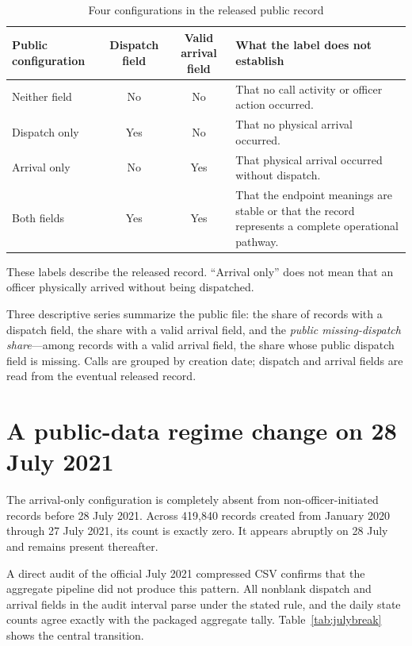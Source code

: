 \documentclass[11pt]{article}
\begin{document}
\begin{table}[!htbp]
\centering
\caption{Four configurations in the released public record}
\label{tab:states}
\begin{tabularx}{\textwidth}{@{}lccX@{}}
\toprule
Public configuration & Dispatch field & Valid arrival field & What the label does not establish \\
\midrule
Neither field & No & No & That no call activity or officer action occurred. \\
Dispatch only & Yes & No & That no physical arrival occurred. \\
Arrival only & No & Yes & That physical arrival occurred without dispatch. \\
Both fields & Yes & Yes & That the endpoint meanings are stable or that the record represents a complete operational pathway. \\
\bottomrule
\end{tabularx}
\begin{minipage}{0.96\textwidth}\footnotesize
These labels describe the released record. ``Arrival only'' does not mean that an officer physically arrived without being dispatched.
\end{minipage}
\end{table}

Three descriptive series summarize the public file: the share of records with a dispatch field, the share with a valid arrival field, and the \emph{public missing-dispatch share}---among records with a valid arrival field, the share whose public dispatch field is missing. Calls are grouped by creation date; dispatch and arrival fields are read from the eventual released record.

\section{A public-data regime change on 28 July 2021}

The arrival-only configuration is completely absent from non-officer-initiated records before 28 July 2021. Across 419,840 records created from January 2020 through 27 July 2021, its count is exactly zero. It appears abruptly on 28 July and remains present thereafter.

A direct audit of the official July 2021 compressed CSV confirms that the aggregate pipeline did not produce this pattern. All nonblank dispatch and arrival fields in the audit interval parse under the stated rule, and the daily state counts agree exactly with the packaged aggregate tally. Table~\ref{tab:julybreak} shows the central transition.
\end{document}
